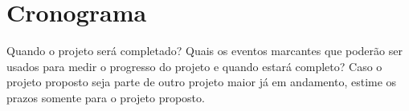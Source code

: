 \chapter{Cronograma}\label{chp:cronograma}

Quando o projeto será completado? Quais os eventos marcantes que poderão ser usados para medir o progresso do projeto e quando estará completo? Caso o projeto proposto seja parte de outro projeto maior já em andamento, estime os prazos somente para o projeto proposto.